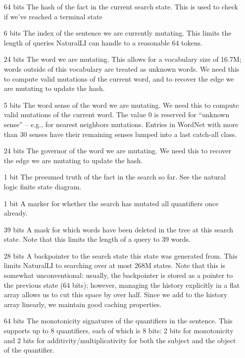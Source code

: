 \begin{itemize}
  \item[64 bits] The hash of the fact in the current search state.
                 This is used to check if we've reached a terminal state
  \item[6 bits]  The index of the sentence we are currently mutating.
                 This limits the length of queries NaturalLI can handle to a reasonable 64 tokens.
  \item[24 bits] The word we are mutating. This allows for a vocabulary size of 16.7M; words outside
                 of this vocabulary are treated as unknown words. 
                 We need this to compute valid mutations of the current word, and
                 to recover the edge we are mutating to update the hash.
  \item[5 bits]  The word sense of the word we are mutating. 
                 We need this to compute valid mutations of the current word.
                 The value 0 is reserved for ``unknown sense'' -- e.g., for nearest neighbors mutations.                 
                 Entries in WordNet with more than 30
                 senses have their remaining senses lumped into a last catch-all class.
  \item[24 bits] The governor of the word we are mutating.
                 We need this to recover the edge we are mutating to update the hash.
  \item[1 bit]   The presumed truth of the fact in the search so far. See the natural logic 
                 finite state diagram.
  \item[1 bit]   A marker for whether the search has mutated all quantifiers once already.
  \item[39 bits] A mask for which words have been deleted in the tree at this search state.
                 Note that this limits the length of a query to 39 words.
  \item[28 bits] A backpointer to the search state this state was generated from.
                 This limits NaturalLI to searching over at most 268M states.
                 Note that this is somewhat unconventional: usually, the backpointer is stored as a
                 pointer to the previous state (64 bits); however, managing the history explicitly
                 in a flat array allows us to cut this space by over half.
                 Since we add to the history array linearly, we maintain good caching properties.
  \item[64 bits] The monotonicity signatures of the quantifiers in the sentence.
                 This supports up to 8 quantifiers, each of which is 8 bits: 2 bits for monotonicity and
                 2 bits for additivity/multiplicativity for both the subject and the object of the quantifier.
\end{itemize}


